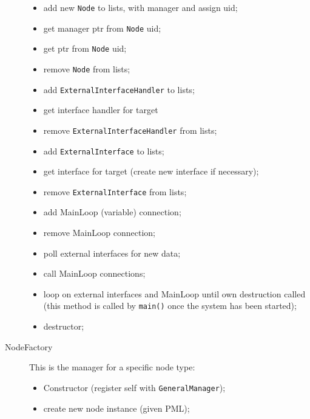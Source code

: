 \documentclass[pdftex,a4paper]{article}
\begin{document}
\begin{description}
\begin{itemize}
\item add new {\tt Node} to lists, with manager and assign uid;

\item get manager ptr from {\tt Node} uid;

\item get ptr from {\tt Node} uid;

\item remove {\tt Node} from lists;

\item add {\tt ExternalInterfaceHandler} to lists;

\item get interface handler for target

\item remove {\tt ExternalInterfaceHandler} from lists;

\item add {\tt ExternalInterface} to lists;

\item get interface for target (create new interface if necessary);

\item remove {\tt ExternalInterface} from lists;

\item add MainLoop (variable) connection;

\item remove MainLoop connection;

\item poll external interfaces for new data;

\item call MainLoop connections;

\item loop on external interfaces and MainLoop until own destruction
  called (this method is called by {\tt main()} once the system has
  been started);

\item destructor;

\end{itemize}

\item[NodeFactory] This is the manager for a specific node type:

\begin{itemize}

\item Constructor (register self with {\tt GeneralManager});

\item create new node instance (given PML);


\end{itemize}
\end{description}
\end{document}
